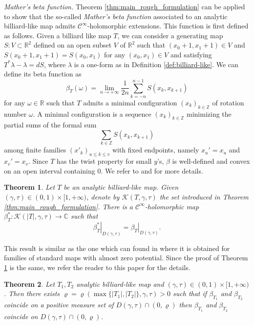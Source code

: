 \documentclass[10pt]{article}
\newtheorem{theorem}{Theorem}[section]
\newcommand{\Z}{\mathbb{Z}}
\newcommand{\R}{\mathbb{R}}
\newcommand{\C}{\mathbb{C}}
\begin{document}
\vspace{0.2cm}
\noindent \textit{Mather's beta function.} Theorem \ref{thm:main_rough_formulation} can be applied to show that the so-called \emph{Mather's beta function} associated to an analytic billiard-like map admits $\mathscr C^\infty$-holomorphic extensions. This function is first defined as follows. Given a billiard like map $T$, 
we can consider a generating map $S:V\subset \R^2$ defined on an open subset $V$ of $\R^2$ such that $(x_0+1,x_1+1)\in V$ and $S(x_0+1,x_1+1)=S(x_0,x_1)$ for any $(x_0,x_1)\in V$ and satisfying $T^\ast\lambda-\lambda=dS$, where $\lambda$ is a one-form as in Definition \ref{def:billiard-like}. We can define its beta function as 
\[
\beta_T(\omega) = \lim_{n\to+\infty}\frac{1}{2n}\sum_{k=-n}^{n-1}S(x_k,x_{k+1})
\]
for any $\omega\in\R$ such that $T$ admits a minimal configuration $(x_k)_{k\in\Z}$ of rotation number $\omega$. A minimal configuration is a sequence $(x_k)_{k\in\Z}$ minimizing the partial sums of the formal sum
\[
\sum_{k\in\Z}S(x_k,x_{k+1})
\]
among finite families $(x'_k)_{u\leq k\leq v}$ with fixed endpoints, namely $x_u'=x_u$ and $x_v'=x_v$. 
Since $T$ has the twist property for small $y$'s, $\beta$ is well-defined and convex on an open interval containing $0$.
We refer to \cite{Gole} and \cite{Siburg} for more details.

\begin{theorem}
\label{thm:mather_beta_function}
 Let $T$ be an analytic billiard-like map. Given $(\gamma,\tau)\in(0,1)\times[1,+\infty)$, denote by $\mathcal K(T, \gamma,\tau)$ the set introduced in Theorem \ref{thm:main_rough_formulation}. There is a $\mathscr C^{\infty}$-holomorphic map
 $\beta^{\ast}_T:\mathcal K(|T|, \gamma,\tau)\to\C$
 such that 
 \[
 \left.{\beta^{\ast}_T}\right|_{D(\gamma,\tau)} = \left.{\beta_T}\right|_{ D(\gamma,\tau)}.
 \]
\end{theorem}

This result is similar as the one which can found in \cite{CMSA} where it is obtained for families of standard maps with almost zero potential. Since the proof of Theorem \ref{thm:mather_beta_function} is the same, we refer the reader to this paper for the details.

\begin{theorem}
    \label{thm:quasianalyticity_beta}
    Let $T_1,T_2$ analytic billiard-like map and $(\gamma,\tau)\in(0,1)\times[1,+\infty)$. Then there exists $\varrho = \varrho(\max\{|T_1|, |T_2|\}, \gamma, \tau) > 0$ such that if $\beta_{T_1}$ and $\beta_{T_2}$ coincide on a positive measure set of $D(\gamma, \tau) \cap (0, \varrho)$ then $\beta_{T_1}$ and $\beta_{T_2}$ coincide on $D(\gamma, \tau) \cap (0, \varrho)$.
\end{theorem}
\end{document}
